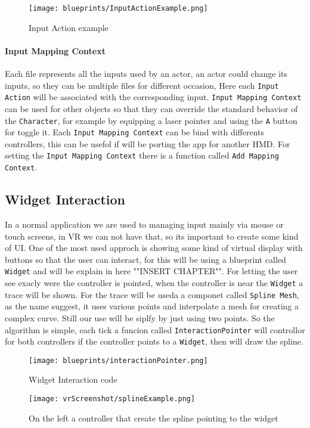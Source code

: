\begin{figure}[h]
    \centering
    \texttt{[image: blueprints/InputActionExample.png]}
    \caption{Input Action example}
    \label{fig:InputAction}
\end{figure}

\paragraph{Input Mapping Context}
Each file represents all the inputs used by an actor, an actor could change its inputs, so they can be multiple files for different occasion,
Here each \verb|Input Action| will be associated with the corresponding input.
\verb|Input Mapping Context| can be used for other objects so that they can override the standard behavior of the \verb|Character|, for example by equipping a laser pointer and using the \verb|A| button for toggle it.
Each \verb|Input Mapping Context| can be bind with differents controllers, this can be usefol if will be porting the app for another \ac{HMD}.
For setting the \verb|Input Mapping Context| there is a function called \verb|Add Mapping Context|.

\subsection{Widget Interaction}
\noindent 
In a normal application we are used to managing input mainly via mouse or touch screens, in \ac{VR} we can not have that, so its important to create some kind of \ac{UI}.
One of the most used approch is showing some kind of virtual display with buttons so that the user can interact, for this will be using a blueprint called \verb|Widget| and will be explain in here ""INSERT CHAPTER"".
For letting the user see exacly were the controller is pointed, when the controller is near the \verb|Widget| a trace will be shown.
For the trace will be useda a componet called \verb|Spline Mesh|, as the name suggest, it uses various points and interpolate a mesh for creating a complex curve.
Still our use will be siplfy by just using two points. So the algorithm is simple, each tick a funcion called \verb|InteractionPointer| will controllor for both controllers if the controller points to a \verb|Widget|, then will draw the spline.

\begin{figure}[h]
    \centering
    \texttt{[image: blueprints/interactionPointer.png]}
    \caption{Widget Interaction code}
    \label{fig:InteractionPointer}
\end{figure}

\begin{figure}[h]
    \centering
    \texttt{[image: vrScreenshot/splineExample.png]}
    \caption{On the left a controller that create the spline pointing to the widget}
    \label{fig:splineExample}
\end{figure}